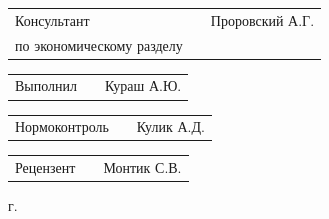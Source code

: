 \begin{titlepage}
\begin{flushleft}
  \begin{tabular}{p{6.5cm} p{4.767cm} p{5.633cm}}
    \raggedleft Консультант & & Проровский А.Г. \\
    \raggedleft по экономическому разделу & &
  \end{tabular}

  \vspace{14pt}

  \begin{tabular}{p{6.5cm} p{4.767cm} p{5.633cm}}
    \raggedleft Выполнил & & Кураш А.Ю. \\
  \end{tabular}

  \vspace{14pt}

  \begin{tabular}{p{6.5cm} p{4.767cm} p{5.633cm}}
    \raggedleft Нормоконтроль & & Кулик А.Д. \\
  \end{tabular}

  \vspace{14pt}

  \begin{tabular}{p{6.5cm} p{4.767cm} p{5.633cm}}
    \raggedleft Рецензент & & Монтик С.В. \\
  \end{tabular}
  
\end{flushleft}


\vspace{45pt}
\begin{center}
\cyrillicfontsf 
\englishfontsf
\fontsize{14pt}{21pt} г.
\end{center}

\end{titlepage}













